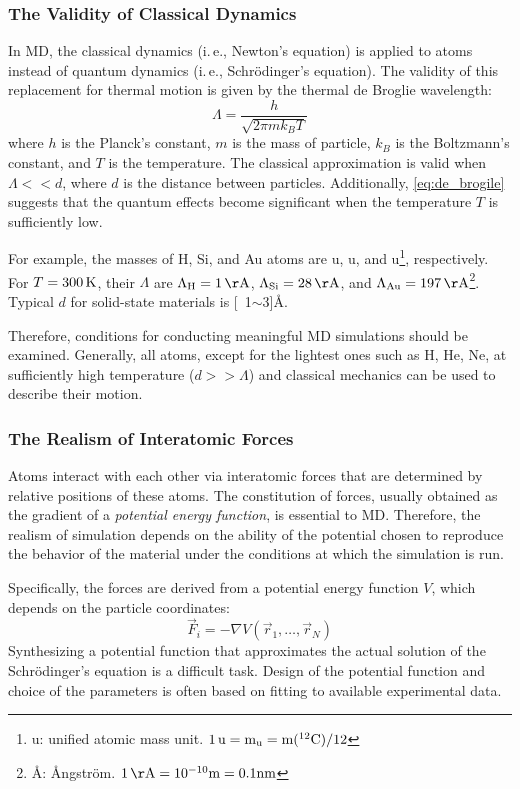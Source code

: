 \documentclass[a4paper,10pt,technote,compsoc,onecolumn]{IEEEtran}
\newcommand{\ie}{i.\,e., }
\numberwithin{equation}{section}
\begin{document}
\subsubsection{The Validity of Classical Dynamics}
In \ac{MD}, the classical dynamics (\ie Newton's equation) is applied to atoms
instead of quantum dynamics (\ie Schr\"{o}dinger's equation). The validity of
this replacement for thermal motion is given by the thermal de Broglie
wavelength:
\begin{equation}\label{eq:de_brogile}
  \Lambda=\frac{h}{\sqrt{2\pi mk_BT}}
\end{equation}
where $h$ is the Planck's constant, $m$ is the mass of particle, $k_B$ is the
Boltzmann's constant, and $T$ is the temperature. The classical approximation
is valid when $\Lambda << d$, where $d$ is the distance between particles.
Additionally, \autoref{eq:de_brogile} suggests that the quantum effects become
significant when the temperature $T$ is sufficiently low.

For example, the masses of H, Si, and Au atoms are \unit[1]{u}, \unit[28]{u},
and \unit[197]{u}\footnote{\unit{u}: unified atomic mass unit.
$\unit[1]{u}=\mathrm{m_u}=\mathrm{m({}^{12}C)}/12$}, respectively. For
$T=\unit[300]{K}$, their $\Lambda$ are $\Lambda_{\mathrm{H}}=\unit[1]{\AA}$,
$\Lambda_{\mathrm{Si}}=\unit[28]{\AA}$, and
$\Lambda_{\mathrm{Au}}=\unit[197]{\AA}$\footnote{\unit{\AA}: \AA ngstr\"om.
$\unit[1]{\AA}=10^{-10}\unit{m}=0.1\unit{nm}$}. Typical $d$ for solid-state
materials is \unit[1$\sim$3]{\AA}.

Therefore, conditions for conducting meaningful \ac{MD} simulations should be
examined. Generally, all atoms, except for the lightest ones such as H, He, Ne,
at sufficiently high temperature ($d >> \Lambda$) and classical mechanics can
be used to describe their motion.

\subsubsection{The Realism of Interatomic Forces}
Atoms interact with each other via interatomic forces that are determined by
relative positions of these atoms. The constitution of forces, usually obtained
as the gradient of a {\em potential energy function}, is essential to \ac{MD}.
Therefore, the realism of simulation depends on the ability of the potential
chosen to reproduce the behavior of the material under the conditions at which
the simulation is run.

Specifically, the forces are derived from a potential energy function $V$,
which depends on the particle coordinates:
\begin{equation}
  \vec{F}_i=-\nabla V(\vec{r}_1,\ldots,\vec{r}_N)
\end{equation}
Synthesizing a potential function that approximates the actual solution of the
Schr\"{o}dinger's equation is a difficult task. Design of the potential
function and choice of the parameters is often based on fitting to available
experimental data.
\end{document}
